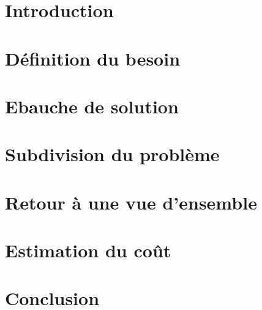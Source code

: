 \documentclass[11pt]{article}
\begin{document}


\newpage
\tableofcontents
\newpage
{}

\section{Introduction}

	

\newpage
\section{Définition du besoin}

	
	


\newpage
\section{Ebauche de solution}

	


\newpage
\section{Subdivision du problème}

	

\newpage
\section{Retour à une vue d'ensemble}

	

\newpage
\section{Estimation du coût}

	

\newpage
\section{Conclusion}
	
	

\setcounter{secnumdepth}{0}
\renewcommand{\thesubsection}{\Alph{subsection}}
\end{document}
